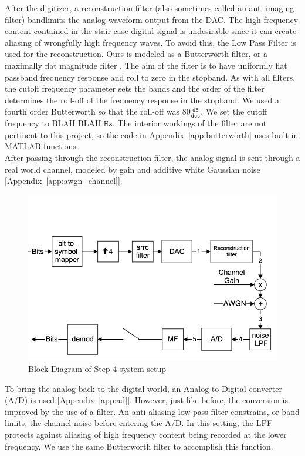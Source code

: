 \documentclass[]{article}
\begin{document}
After the digitizer, a reconstruction filter (also sometimes called an anti-imaging filter) bandlimits the analog waveform output from the DAC.  The high frequency content contained in the stair-case digital signal is undesirable since it can create aliasing of wrongfully high frequency waves.  To avoid this, the Low Pass Filter is used for the reconstruction.  Ours is modeled as a Butterworth filter, or a maximally flat magnitude filter \cite{butter}.  The aim of the filter is to have uniformly flat passband frequency response and roll to zero in the stopband.  As with all filters, the cutoff frequency parameter sets the bands and the order of the filter determines the roll-off of the frequency response in the stopband.  We used a fourth order Butterworth so that the roll-off was $80 \mathtt{\frac{dB}{dec}}$.  We set the cutoff frequency to BLAH BLAH $\mathtt{Hz}$. The interior workings of the filter are not pertinent to this project, so the code in Appendix~\ref{app:butterworth} uses built-in MATLAB functions.  \\

After passing through the reconstruction filter, the analog signal is  sent through a real world channel, modeled by gain and additive white Gaussian noise [Appendix~\ref{app:awgn_channel}].\\

\begin{figure}[H]
\centering
\includegraphics[width=\textwidth]{step4.png}
\caption{Block Diagram of Step 4 system setup\label{fig:step4}}
\end{figure}

To bring the analog back to the digital world, an Analog-to-Digital converter (A/D) is used [Appendix~\ref{app:ad}].  However, just like before, the conversion is improved by the use of a filter.  An anti-aliasing low-pass filter constrains, or band limits, the channel noise before entering the A/D.  In this setting, the LPF protects against aliasing of high frequency content being recorded at the lower frequency.  We use the same Butterworth filter to accomplish this function.\\
\end{document}
